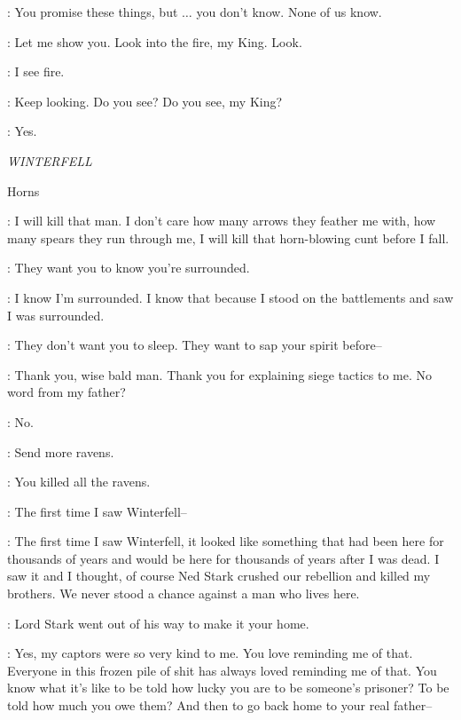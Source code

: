 \STANNIS: You promise these things, but $\ldots$ you don't know. None of us know. 

\MELISANDRE: Let me show you.  Look into the fire, my King. Look. 

\STANNIS: I see fire. 

\MELISANDRE: Keep looking. Do you see? Do you see, my King? 


\STANNIS: Yes. 


\scene

\textit{WINTERFELL} 

\sfx Horns


\THEON: I will kill that man. I don't care how many arrows they feather me with, how many spears they run through me, I will kill that horn-blowing cunt before I fall. 

\LUWIN: They want you to know you're surrounded. 

\THEON: I know I'm surrounded. I know that because I stood on the battlements and saw I was surrounded. 

\LUWIN: They don't want you to sleep. They want to sap your spirit before--  

\THEON: Thank you, wise bald man. Thank you for explaining siege tactics to me. No word from my father? 

\LUWIN: No. 

\THEON: Send more ravens. 

\LUWIN: You killed all the ravens. 

\THEON: The first time I saw Winterfell-- 


\THEON: The first time I saw Winterfell, it looked like something that had been here for thousands of years and would be here for thousands of years after I was dead. I saw it and I thought, of course Ned Stark crushed our rebellion and killed my brothers. We never stood a chance against a man who lives here. 

\LUWIN: Lord Stark went out of his way to make it your home. 

\THEON: Yes, my captors were so very kind to me. You love reminding me of that. Everyone in this frozen pile of shit has always loved reminding me of that. You know what it's like to be told how lucky you are to be someone's prisoner? To be told how much you owe them? And then to go back home to your real father--

